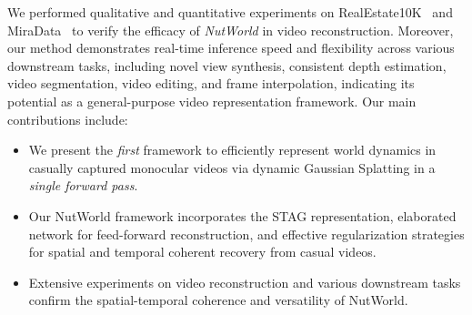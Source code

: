 We performed qualitative and quantitative experiments on RealEstate10K~\cite{zhou2018stereo} and MiraData~\cite{ju2024miradatalargescalevideodataset} to verify the efficacy of \textit{NutWorld} in video reconstruction. Moreover, our method demonstrates real-time inference speed and flexibility across various downstream tasks, including novel view synthesis, consistent depth estimation, video segmentation, video editing, and frame interpolation, indicating its potential as a general-purpose video representation framework. Our main contributions include:
\begin{itemize}[leftmargin=*]
\item We present the \textit{first} framework to efficiently represent world dynamics in casually captured monocular videos via dynamic Gaussian Splatting in a \textit{single forward pass}.

\item Our NutWorld framework incorporates the STAG representation, elaborated network for feed-forward reconstruction, and effective regularization strategies for spatial and temporal coherent recovery from casual videos.

\item Extensive experiments on video reconstruction and various downstream tasks confirm the spatial-temporal coherence and versatility of NutWorld.
\end{itemize}











\label{sec:intro}

